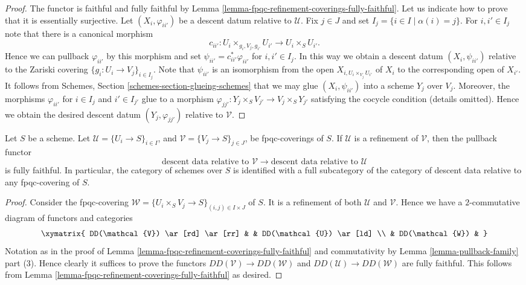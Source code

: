 \begin{proof}
The functor is faithful and fully faithful by
Lemma \ref{lemma-fpqc-refinement-coverings-fully-faithful}.
Let us indicate how to prove that it is essentially surjective.
Let $(X_i, \varphi_{ii'})$ be a descent datum relative to $\mathcal{U}$.
Fix $j \in J$ and set $I_j = \{i \in I \mid \alpha(i) = j\}$.
For $i, i' \in I_j$ note that there is a canonical morphism
$$
c_{ii'} : U_i \times_{g_i, V_j, g_{i'}} U_{i'} \to U_i \times_S U_{i'}.
$$
Hence we can pullback $\varphi_{ii'}$ by this morphism
and set $\psi_{ii'} = c_{ii'}^*\varphi_{ii'}$ for $i, i' \in I_j$.
In this way we obtain a descent datum $(X_i, \psi_{ii'})$
relative to the Zariski covering
$\{g_i : U_i \to V_j\}_{i \in I_j}$.
Note that $\psi_{ii'}$ is an isomorphism from the open
$X_{i, U_i \times_{V_j} U_{i'}}$ of $X_i$ to the corresponding
open of $X_{i'}$. It follows from
Schemes, Section \ref{schemes-section-glueing-schemes}
that we may glue $(X_i, \psi_{ii'})$ into a scheme
$Y_j$ over $V_j$. Moreover, the morphisms $\varphi_{ii'}$
for $i \in I_j$ and $i' \in I_{j'}$ glue to a morphism
$\varphi_{jj'} : Y_j \times_S V_{j'} \to V_j \times_S Y_{j'}$
satisfying the cocycle condition (details omitted).
Hence we obtain the desired descent datum
$(Y_j, \varphi_{jj'})$ relative to $\mathcal{V}$.
\end{proof}

\begin{lemma}
\label{lemma-refine-coverings-fully-faithful}
Let $S$ be a scheme.
Let $\mathcal{U} = \{U_i \to S\}_{i \in I}$, and
$\mathcal{V} = \{V_j \to S\}_{j \in J}$,
be fpqc-coverings of $S$.
If $\mathcal{U}$ is a refinement of $\mathcal{V}$,
then the pullback functor
$$
\text{descent data relative to }
\mathcal{V}
\longrightarrow
\text{descent data relative to }
\mathcal{U}
$$
is fully faithful.
In particular, the category of schemes over $S$
is identified with a full subcategory of the category
of descent data relative to any fpqc-covering of $S$.
\end{lemma}

\begin{proof}
Consider the fpqc-covering
$\mathcal{W} = \{U_i \times_S V_j \to S\}_{(i, j) \in I \times J}$ of $S$.
It is a refinement of both $\mathcal{U}$ and $\mathcal{V}$.
Hence we have a $2$-commutative diagram of functors and categories
$$
\xymatrix{
DD(\mathcal{V}) \ar[rd] \ar[rr] & & DD(\mathcal{U}) \ar[ld] \\
& DD(\mathcal{W}) &
}
$$
Notation as in the proof of
Lemma \ref{lemma-fpqc-refinement-coverings-fully-faithful} and
commutativity by Lemma \ref{lemma-pullback-family} part (3).
Hence clearly it suffices to prove the functors
$DD(\mathcal{V}) \to DD(\mathcal{W})$ and
$DD(\mathcal{U}) \to DD(\mathcal{W})$ are fully faithful.
This follows from
Lemma \ref{lemma-fpqc-refinement-coverings-fully-faithful}
as desired.
\end{proof}

